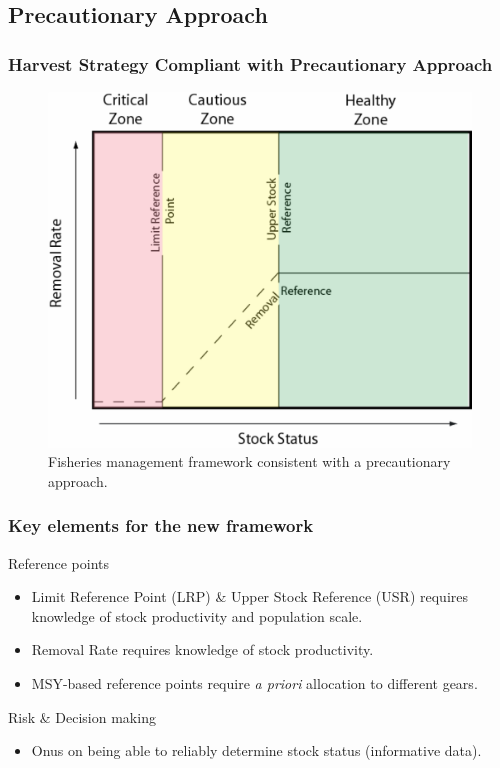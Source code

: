 \subsection{Precautionary Approach} %
\label{sub:precautionary_approach}
\begin{frame}
	\frametitle{Harvest Strategy Compliant with Precautionary Approach} 
	\begin{figure}
		[htbp] \centering 
		\includegraphics[width=0.7
		\textwidth]{SSF} \caption{Fisheries management framework consistent with a precautionary approach.} \label{fig:SSF} 
	\end{figure}
\end{frame}

%
\begin{frame}
	\frametitle{Key elements for the new framework} 
	\begin{block}
		{Reference points} 
		\begin{itemize}
			\item Limit Reference Point (LRP) \& Upper Stock Reference (USR) requires knowledge of stock productivity and population scale. 
			\item Removal Rate requires knowledge of stock productivity. 
			\item MSY-based reference points require \textit{a priori} allocation to different gears. 
		\end{itemize}
	\end{block}
	\begin{block}
		{Risk \& Decision making} 
		\begin{itemize}
			\item Onus on being able to reliably determine stock status (informative data). 
		\end{itemize}
	\end{block}
\end{frame}



